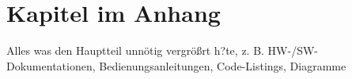 \chapter{Kapitel im Anhang}
\label{sec:a-kapitel}

Alles was den Hauptteil unnötig vergrößrt h?te, z. B. HW-/SW-Dokumentationen, Bedienungsanleitungen, Code-Listings, Diagramme
